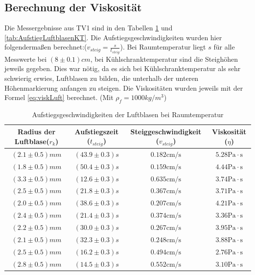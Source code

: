 \documentclass{report}
\begin{document}
\subsection{Berechnung der Viskosität}
Die Messergebnisse aus TV1 sind in den Tabellen \ref{tab:AufstiegLuftblasenRT} und \ref{tab:AufstiegLuftblasenKT}.
Die Aufstiegsgeschwindigkeiten wurden hier folgendermaßen berechnet:($v_{steig} = \frac{s}{t_{steig}}$).
Bei Raumtemperatur liegt $s$ für alle Messwerte bei $(8\pm0.1)cm$, bei Kühlschranktemperatur sind die Steighöhen jeweils gegeben.
Dies war nötig, da es sich bei Kühlschranktemperatur als sehr schwierig erwies, Luftblasen zu bilden, die unterhalb der unteren Höhenmarkierung anfangen zu steigen.
Die Viskositäten wurden jeweils mit der Formel \ref{eq:viskLuft} berechnet. (Mit $\rho_f = 1000 kg/m^3$)
\begin{table}[H]
    \centering
    \caption{Aufstiegsgeschwindigkeiten der Luftblasen bei Raumtemperatur}
    \label{tab:AufstiegLuftblasenRT}
    \begin{tabular}{c c c c}
        \hline
        Radius der Luftblase($r_k$) & Aufstiegszeit ($t_{steig}$) & Steiggeschwindigkeit ($v_{steig}$) & Viskosität ($\eta$) \\
        \hline
        $(2.1 \pm 0.5)mm$ & $(43.9 \pm 0.3)s$ & $0.182 \si{\cm} / \si{\s}$  & $5.28 \si{\Pa} \cdot \si{\s}$\\
        $(1.8 \pm 0.5)mm$ & $(50.4 \pm 0.3)s$ & $0.159 \si{\cm} / \si{\s}$  & $4.44 \si{\Pa} \cdot \si{\s}$\\
        $(3.3 \pm 0.5)mm$ & $(12.6 \pm 0.3)s$ & $0.635 \si{\cm} / \si{\s}$  & $3.74 \si{\Pa} \cdot \si{\s}$\\
        $(2.5 \pm 0.5)mm$ & $(21.8 \pm 0.3)s$ & $0.367 \si{\cm} / \si{\s}$  & $3.71\si{\Pa} \cdot \si{\s}$\\
        $(2.0 \pm 0.5)mm$ & $(38.6 \pm 0.3)s$ & $0.207 \si{\cm} / \si{\s}$  & $4.21\si{\Pa} \cdot \si{\s}$\\
        $(2.4 \pm 0.5)mm$ & $(21.4 \pm 0.3)s$ & $0.374 \si{\cm} / \si{\s}$  & $3.36\si{\Pa} \cdot \si{\s}$\\
        $(2.2 \pm 0.5)mm$ & $(30.0 \pm 0.3)s$ & $0.267 \si{\cm} / \si{\s}$  & $3.95\si{\Pa} \cdot \si{\s}$\\
        $(2.1 \pm 0.5)mm$ & $(32.3 \pm 0.3)s$ & $0.248 \si{\cm} / \si{\s}$  & $3.88\si{\Pa} \cdot \si{\s}$\\
        $(2.5 \pm 0.5)mm$ & $(16.2 \pm 0.3)s$ & $0.494 \si{\cm} / \si{\s}$  & $2.76\si{\Pa} \cdot \si{\s}$\\
        $(2.8 \pm 0.5)mm$ & $(14.5 \pm 0.3)s$ & $0.552 \si{\cm} / \si{\s}$  & $3.10\si{\Pa} \cdot \si{\s}$\\
        \hline
    \end{tabular}
\end{table}
\end{document}
